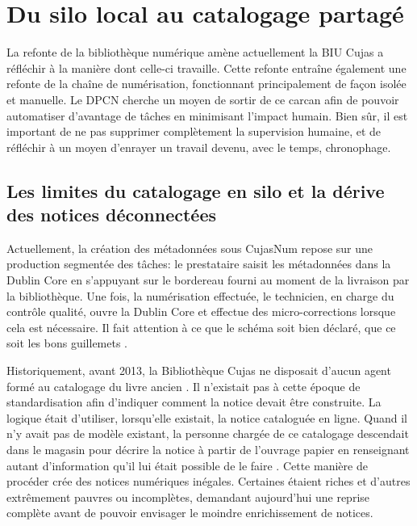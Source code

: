 \section{Du silo local au catalogage partagé}
La refonte de la bibliothèque numérique amène actuellement la \ac{BIU Cujas} a réfléchir à la manière dont celle-ci travaille. Cette refonte entraîne également une refonte de la chaîne de numérisation, fonctionnant principalement de façon isolée et manuelle. Le \ac{DPCN} cherche un moyen de sortir de ce carcan afin de pouvoir automatiser d'avantage de tâches en minimisant l'impact humain. Bien sûr, il est important de ne pas supprimer complètement la supervision humaine, et de réfléchir à un moyen d'enrayer un travail devenu, avec le temps, chronophage.

\subsection{Les limites du catalogage en silo et la dérive des notices déconnectées}

Actuellement, la création des métadonnées sous CujasNum repose sur une production segmentée des tâches: le prestataire saisit les métadonnées dans la Dublin Core en s'appuyant sur le bordereau fourni au moment de la livraison par la bibliothèque. Une fois, la numérisation effectuée, le technicien, en charge du contrôle qualité, ouvre la Dublin Core et effectue des micro-corrections lorsque cela est nécessaire. Il fait attention à ce que le schéma soit bien déclaré, que ce soit les bons guillemets . 

Historiquement, avant 2013, la Bibliothèque Cujas ne disposait d'aucun agent formé au catalogage du livre ancien . Il n'existait pas à cette époque de standardisation afin d'indiquer comment la notice devait être construite. La logique était d'utiliser, lorsqu'elle existait, la notice cataloguée en ligne. Quand il n'y avait pas de modèle existant, la personne chargée de ce catalogage descendait dans le magasin pour décrire la notice à partir de l'ouvrage papier en renseignant autant d'information qu'il lui était possible de le faire . Cette manière de procéder crée des notices numériques inégales. Certaines étaient riches et d'autres extrêmement pauvres ou incomplètes, demandant aujourd'hui une reprise complète avant de pouvoir envisager le moindre enrichissement de notices.

